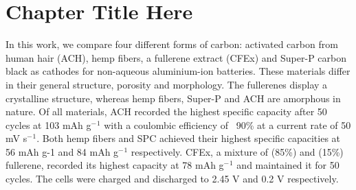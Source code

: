\chapter{Chapter Title Here} %

\label{Chapter1} %


\newcommand{\keyword}[1]{\textbf{#1}}
\newcommand{\tabhead}[1]{\textbf{#1}}
\newcommand{\code}[1]{\texttt{#1}}
\newcommand{\file}[1]{\texttt{\bfseries#1}}
\newcommand{\option}[1]{\texttt{\itshape#1}}
 In this work, we compare four different forms of carbon: activated carbon from human hair (ACH), hemp fibers, a fullerene extract (CFEx) and Super-P carbon black as cathodes for non-aqueous aluminium-ion batteries. These materials differ in their general structure, porosity and morphology. The fullerenes display a crystalline structure, whereas hemp fibers, Super-P and ACH are amorphous in nature. Of all materials, ACH recorded the highest specific capacity after 50 cycles at 103 mAh g$^-{^1}$ with a coulombic efficiency of ~90\% at a current rate of 50 mV s$^-{^1}$. Both hemp fibers and SPC achieved their highest specific capacities at 56 mAh g-1 and 84 mAh g$^-{^1}$ respectively. CFEx, a mixture of  (85\%) and  (15\%) fullerene, recorded its highest capacity at 78 mAh g$^-{^1}$ and maintained it for 50 cycles. The cells were charged and discharged to 2.45 V and 0.2 V respectively. 


